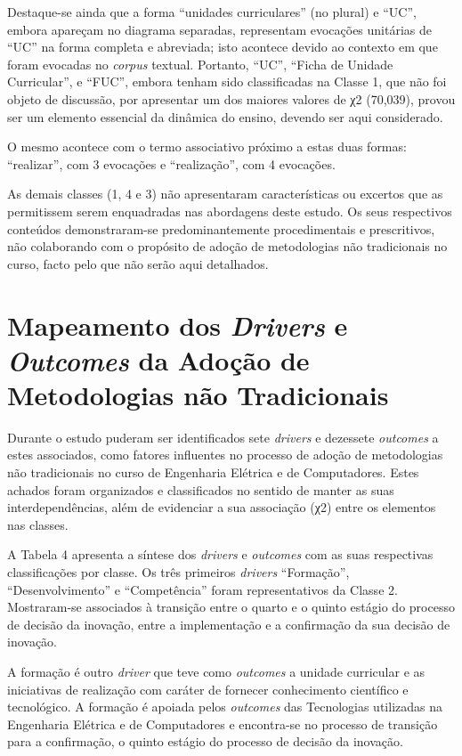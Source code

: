 \documentclass{textolivre}
\begin{document}
Destaque-se ainda que a forma “unidades curriculares” (no plural) e “UC”, embora apareçam no diagrama separadas, representam evocações unitárias de “UC” na forma completa e abreviada; isto acontece devido ao contexto em que foram evocadas no \textit{corpus} textual. Portanto, “UC”, “Ficha de Unidade Curricular”, e “FUC”, embora tenham sido classificadas na Classe 1, que não foi objeto de discussão, por apresentar um dos maiores valores de χ2 (70,039), provou ser um elemento essencial da dinâmica do ensino, devendo ser aqui considerado.

O mesmo acontece com o termo associativo próximo a estas duas formas: “realizar”, com 3 evocações e “realização”, com 4 evocações.

As demais classes (1, 4 e 3) não apresentaram características ou excertos que as permitissem serem enquadradas nas abordagens deste estudo. Os seus respectivos conteúdos demonstraram-se predominantemente procedimentais e prescritivos, não colaborando com o propósito de adoção de metodologias não tradicionais no curso, facto pelo que não serão aqui detalhados.

\section{Mapeamento dos \textit{Drivers} e \textit{Outcomes} da Adoção de Metodologias não Tradicionais}\label{sec-mapeamento}
Durante o estudo puderam ser identificados sete \textit{drivers} e dezessete \textit{outcomes} a estes associados, como fatores influentes no processo de adoção de metodologias não tradicionais no curso de Engenharia Elétrica e de Computadores. Estes achados foram organizados e classificados no sentido de manter as suas interdependências, além de evidenciar a sua associação (χ2) entre os elementos nas classes.  

A Tabela 4 apresenta a síntese dos \textit{drivers} e \textit{outcomes} com as suas respectivas classificações por classe. Os três primeiros \textit{drivers} “Formação”, “Desenvolvimento” e “Competência” foram representativos da Classe 2. Mostraram-se associados à transição entre o quarto e o quinto estágio do processo de decisão da inovação, entre a implementação e a confirmação da sua decisão de inovação.

A formação é outro \textit{driver} que teve como \textit{outcomes} a unidade curricular e as iniciativas de realização com caráter de fornecer conhecimento científico e tecnológico. A formação é apoiada pelos \textit{outcomes} das Tecnologias utilizadas na Engenharia Elétrica e de Computadores e encontra-se no processo de transição para a confirmação, o quinto estágio do processo de decisão da inovação.
\end{document}

